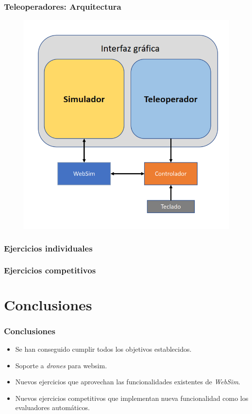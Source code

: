 \documentclass[xcolor={table}]{beamer}
\begin{document}
		
		\begin{frame}
			\frametitle{Teleoperadores: Arquitectura}
			\begin{figure}
			    \centering			    \includegraphics[scale=0.45]{img/arquitecturaTeleoperador.png}
			    \label{fig:teleop}
			\end{figure}
			
		\end{frame}

		\begin{frame}
			\frametitle{Ejercicios individuales}
		\end{frame}
		
		\begin{frame}
			\frametitle{Ejercicios competitivos}
		\end{frame}

	\section{Conclusiones}
		\begin{frame}
			\frametitle{Conclusiones}
			\begin{itemize}
				\item Se han conseguido cumplir todos los objetivos establecidos. 
				\item Soporte a \textit{drones} para websim. 
				\item Nuevos ejercicios que aprovechan las funcionalidades existentes de \textit{WebSim}.
				\item Nuevos ejercicios competitivos que implementan nueva funcionalidad como los evaluadores automáticos. 
			\end{itemize}
		\end{frame}
	
\end{document}
